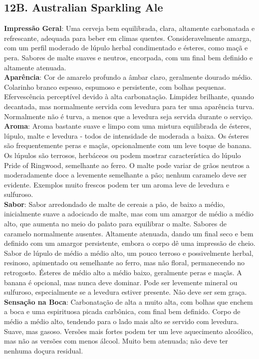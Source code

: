 \subsection*{12B. Australian Sparkling Ale}
\textbf{Impressão Geral}: Uma cerveja bem equilibrada, clara, altamente carbonatada e refrescante, adequada para beber em climas quentes. Consideravelmente amarga, com um perfil moderado de lúpulo herbal condimentado e ésteres, como maçã e pera. Sabores de malte suaves e neutros, encorpada, com um final bem definido e altamente atenuada. \\
\textbf{Aparência}: Cor de amarelo profundo a âmbar claro, geralmente dourado médio. Colarinho branco espesso, espumoso e persistente, com bolhas pequenas. Efervescência perceptível devido à alta carbonatação. Limpidez brilhante, quando decantada, mas normalmente servida com levedura para ter uma aparência turva. Normalmente não é turva, a menos que a levedura seja servida durante o serviço. \\
\textbf{Aroma}: Aroma bastante suave e limpo com uma mistura equilibrada de ésteres, lúpulo, malte e levedura - todos de intensidade de moderada a baixa. Os ésteres são frequentemente peras e maçãs, opcionalmente com um leve toque de banana. Os lúpulos são terrosos, herbáceos ou podem mostrar característica do lúpulo Pride of Ringwood, semelhante ao ferro. O malte pode variar de grãos neutros a moderadamente doce a levemente semelhante a pão; nenhum caramelo deve ser evidente. Exemplos muito frescos podem ter um aroma leve de levedura e sulfuroso. \\
\textbf{Sabor}: Sabor arredondado de malte de cereais a pão, de baixo a médio, inicialmente suave a adocicado de malte, mas com um amargor de médio a médio alto, que aumenta no meio do palato para equilibrar o malte. Sabores de caramelo normalmente ausentes. Altamente atenuada, dando um final seco e bem definido com um amargor persistente, embora o corpo dê uma impressão de cheio. Sabor de lúpulo de médio a médio alto, um pouco terroso e possivelmente herbal, resinoso, apimentado ou semelhante ao ferro, mas não floral, permanecendo no retrogosto. Ésteres de médio alto a médio baixo, geralmente peras e maçãs. A banana é opcional, mas nunca deve dominar. Pode ser levemente mineral ou sulfuroso, especialmente se a levedura estiver presente. Não deve ser sem graça. \\
\textbf{Sensação na Boca}: Carbonatação de alta a muito alta, com bolhas que enchem a boca e uma espirituosa picada carbônica, com final bem definido. Corpo de médio a médio alto, tendendo para o lado mais alto se servido com levedura. Suave, mas gasoso. Versões mais fortes podem ter um leve aquecimento alcoólico, mas não as versões com menos álcool. Muito bem atenuada; não deve ter nenhuma doçura residual. \\
